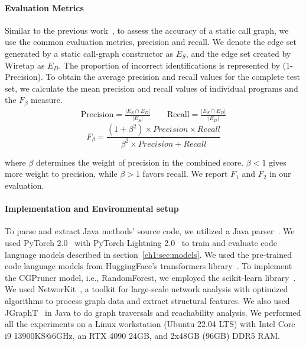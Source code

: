 \paragraph{Evaluation Metrics}\label{ch1:sec:eval-metrics}
Similar to the previous work~\cite{utture2022striking, le2022autopruner}, to assess the accuracy of a static call graph, we use the common evaluation metrics, precision and recall. We denote the edge set generated by a static call-graph constructor as $E_S$, and the edge set created by Wiretap as $E_D$. The proportion of incorrect identifications is represented by (1-Precision). To obtain the average precision and recall values for the complete test set, we calculate the mean precision and recall values of individual programs and the $F_{\beta}$ measure.
%
\begin{align*}
\text{Precision} = \frac{|E_S \cap E_D|}{|E_S|} \quad \quad \text{Recall} = \frac{|E_S \cap E_D|}{|E_D|}
\end{align*}
\begin{equation*}
F_\beta = \frac{(1 + \beta^2) \times Precision \times Recall}{\beta^2 \times Precision + Recall}
\end{equation*}

where $\beta$ determines the weight of precision in the combined score. $\beta < 1$ gives more weight to precision, while $\beta > 1$ favors recall. We report $F_1$ and $F_2$ in our evaluation.

\paragraph{Implementation and Environmental setup}
To parse and extract Java methods' source code, we utilized a Java parser~\cite{javap}. We used PyTorch 2.0~\cite{paszke2019pytorch, pt2} with PyTorch Lightning 2.0~\cite{ptl2} to train and evaluate code language models described in section~\ref{ch1:sec:models}. We used the pre-trained code language models from HuggingFace's transformers library~\cite{wolf2019huggingface}. To implement the CGPruner model, i.e., RandomForest, we employed the scikit-learn library~\cite{pedregosa2011scikit}. We used NetworKit~\cite{angriman2022}, a toolkit for large-scale network analysis with optimized algorithms to process graph data and extract structural features. We also used JGraphT~\cite{jgrapht} in Java to do graph traversals and reachability analysis. We performed all the experiments on a Linux workstation (Ubuntu 22.04 LTS) with Intel Core i9 13900KS@6GHz, an RTX 4090 24GB, and 2x48GB (96GB) DDR5 RAM.

